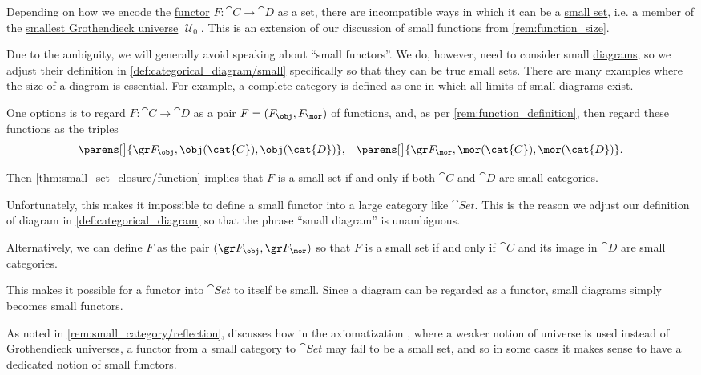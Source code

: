\begin{remark}\label{rem:functor_size}
  Depending on how we encode the \hyperref[def:functor]{functor} \( F: \cat{C} \to \cat{D} \) as a set, there are incompatible ways in which it can be a \hyperref[def:small_set]{small set}, i.e. a member of the \hyperref[def:smallest_grothendieck_universe]{smallest Grothendieck universe} \( \mscrU_0 \). This is an extension of our discussion of small functions from \cref{rem:function_size}.

  Due to the ambiguity, we will generally avoid speaking about \enquote{small functors}. We do, however, need to consider small \hyperref[def:categorical_diagram]{diagrams}, so we adjust their definition in \cref{def:categorical_diagram/small} specifically so that they can be true small sets. There are many examples where the size of a diagram is essential. For example, a \hyperref[def:complete_category]{complete category} is defined as one in which all limits of small diagrams exist.

  \begin{thmenum}
     One options is to regard \( F: \cat{C} \to \cat{D} \) as a pair \( F = (F_{\obj}, F_{\mor}) \) of functions, and, as per \cref{rem:function_definition}, then regard these functions as the triples
    \begin{align*}
      \parens[\big]{ \gr F_{\obj}, \obj(\cat{C}), \obj(\cat{D}) }, && \parens[\big]{ \gr F_{\mor}, \mor(\cat{C}), \mor(\cat{D}) }.
    \end{align*}

    Then \cref{thm:small_set_closure/function} implies that \( F \) is a small set if and only if both \( \cat{C} \) and \( \cat{D} \) are \hyperref[def:small_category]{small categories}.

    Unfortunately, this makes it impossible to define a small functor into a large category like \( \cat{Set} \). This is the reason we adjust our definition of diagram in \cref{def:categorical_diagram} so that the phrase \enquote{small diagram} is unambiguous.

     Alternatively, we can define \( F \) as the pair \( (\gr F_{\obj}, \gr F_{\mor}) \) so that \( F \) is a small set if and only if \( \cat{C} \) and its image in \( \cat{D} \) are small categories.

    This makes it possible for a functor into \( \cat{Set} \) to itself be small. Since a diagram can be regarded as a functor, small diagrams simply becomes small functors.

    As noted in \cref{rem:small_category/reflection}, \textcite[26]{Shulman2008SetTheoryForCategoryTheory} discusses how in the axiomatization , where a weaker notion of universe is used instead of Grothendieck universes, a functor from a small category to \( \cat{Set} \) may fail to be a small set, and so in some cases it makes sense to have a dedicated notion of small functors.
  \end{thmenum}
\end{remark}

